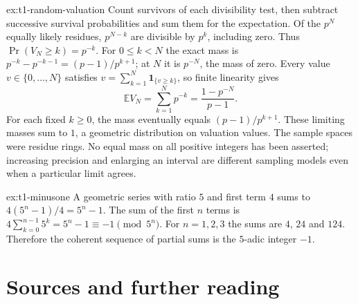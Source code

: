 \begin{solution}{ex:t1-random-valuation}
\idea Count survivors of each divisibility test, then subtract successive
survival probabilities and sum them for the expectation.
\writeup Of the $p^N$ equally likely residues, $p^{N-k}$ are divisible
by $p^k$, including zero. Thus $\operatorname{Pr}(V_N\ge k)=p^{-k}$.
For $0\le k<N$ the exact mass is
$p^{-k}-p^{-k-1}=(p-1)/p^{k+1}$; at $N$ it is $p^{-N}$,
the mass of zero.
Every value $v\in\{0,\dots,N\}$ satisfies
$v=\sum_{k=1}^N\mathbf1_{\{v\ge k\}}$, so finite linearity gives
\[
\mathbb E V_N=\sum_{k=1}^Np^{-k}=\frac{1-p^{-N}}{p-1}.
\]
For each fixed $k\ge0$, the mass eventually equals $(p-1)/p^{k+1}$.
These limiting masses sum to $1$, a geometric distribution on valuation values.
The sample spaces were residue rings. No equal mass on all positive integers
has been asserted; increasing precision and enlarging an interval are
different sampling models even when a particular limit agrees.
\end{solution}

\begin{solution}{ex:t1-minusone}
\idea A geometric series with ratio $5$ and first term $4$ sums to $4(5^n-1)/4=5^n-1$.
\writeup The sum of the first $n$ terms is $4\sum_{k=0}^{n-1}5^k=5^n-1\equiv -1\pmod{5^n}$. For $n=1,2,3$ the sums are $4$, $24$ and $124$. Therefore the coherent sequence of partial sums is the $5$-adic integer $-1$.
\end{solution}

\section*{Sources and further reading}

